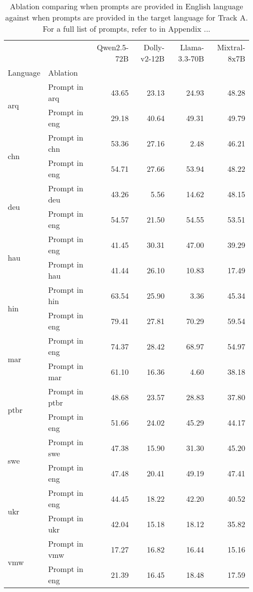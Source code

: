 \begin{table*}
\centering
\begin{tabular}{llrrrr}
\toprule
 &  & Qwen2.5-72B & Dolly-v2-12B & Llama-3.3-70B & Mixtral-8x7B \\
Language & Ablation &  &  &  &  \\
\midrule
\multirow[t]{2}{*}{arq} & Prompt in arq & 43.65 & 23.13 & 24.93 & 48.28 \\
 & Prompt in eng & 29.18 & 40.64 & 49.31 & 49.79 \\
\cline{1-6}
\multirow[t]{2}{*}{chn} & Prompt in chn & 53.36 & 27.16 & 2.48 & 46.21 \\
 & Prompt in eng & 54.71 & 27.66 & 53.94 & 48.22 \\
\cline{1-6}
\multirow[t]{2}{*}{deu} & Prompt in deu & 43.26 & 5.56 & 14.62 & 48.15 \\
 & Prompt in eng & 54.57 & 21.50 & 54.55 & 53.51 \\
\cline{1-6}
\multirow[t]{2}{*}{hau} & Prompt in eng & 41.45 & 30.31 & 47.00 & 39.29 \\
 & Prompt in hau & 41.44 & 26.10 & 10.83 & 17.49 \\
\cline{1-6}
\multirow[t]{2}{*}{hin} & Prompt in hin & 63.54 & 25.90 & 3.36 & 45.34 \\
 & Prompt in eng & 79.41 & 27.81 & 70.29 & 59.54 \\
\cline{1-6}
\multirow[t]{2}{*}{mar} & Prompt in eng & 74.37 & 28.42 & 68.97 & 54.97 \\
 & Prompt in mar & 61.10 & 16.36 & 4.60 & 38.18 \\
\cline{1-6}
\multirow[t]{2}{*}{ptbr} & Prompt in ptbr & 48.68 & 23.57 & 28.83 & 37.80 \\
 & Prompt in eng & 51.66 & 24.02 & 45.29 & 44.17 \\
\cline{1-6}
\multirow[t]{2}{*}{swe} & Prompt in swe & 47.38 & 15.90 & 31.30 & 45.20 \\
 & Prompt in eng & 47.48 & 20.41 & 49.19 & 47.41 \\
\cline{1-6}
\multirow[t]{2}{*}{ukr} & Prompt in eng & 44.45 & 18.22 & 42.20 & 40.52 \\
 & Prompt in ukr & 42.04 & 15.18 & 18.12 & 35.82 \\
\cline{1-6}
\multirow[t]{2}{*}{vmw} & Prompt in vmw & 17.27 & 16.82 & 16.44 & 15.16 \\
 & Prompt in eng & 21.39 & 16.45 & 18.48 & 17.59 \\
\cline{1-6}
\bottomrule
\end{tabular}
\caption{Ablation comparing when prompts are provided in English language against when prompts are provided in the target language for Track A. For a full list of prompts, refer to  in Appendix ...}
\label{tab:ablation-multilingual-prompts}
\end{table*}